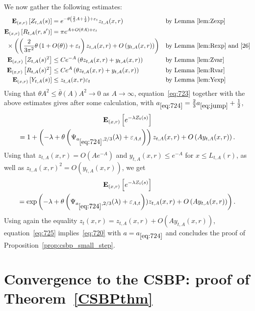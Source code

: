 \documentclass[10pt]{amsart}
\theoremstyle{definition}\newtheorem{defi}[theo]{Definition}\newtheorem{rema}[theo]{Remark}\newtheorem{exam}[theo]{Example}\newtheorem{exem}[theo]{Example}\newtheorem{nota}[theo]{Notation}
\newcommand*\eps{\varepsilon}
\newcommand*\E{\mathbf{E}}
\newcommand{\1} {\mathds{1}}
\renewcommand*\to{\rightarrow}
\begin{document}
We now gather the following estimates:
\begin{align*}
\E_{(x,r)}\left[Z_{t,A}(s)\right] &= e^{-\theta\left(\frac{2}{3}A+\frac{1}{2}\right)+\eps_t} z_{t,A}(x,r) && \text{by Lemma~\ref{lem:Zexp}}\\
\E_{(x,r)}\left[R_{t,A}(r,s')\right] &= \pi e^{A+O(\theta A)+\eps_t}\\
&\hspace{-1in}\times \left(\left(\frac{2}{3\pi^2}\theta\left(1+ O(\theta)\right) + \eps_t \right) z_{t,A}(x,r) + O\left(y_{t,A}(x,r)\right)\right) && \text{by Lemma~\ref{lem:Rexp} and~\eqref{26}}\\
\E_{(x,r)}\left[Z_{t,A}(s)^2\right] &\le Ce^{-A}\left(\theta z_{t,A}(x,r)+y_{t,A}(x,r)\right) && \text{by Lemma~\ref{lem:Zvar}}\\
\E_{(x,r)}\left[R_{t,A}(s)^2\right] &\le Ce^A\left(\theta z_{t,A}(x,r)+y_{t,A}(x,r)\right) && \text{by Lemma~\ref{lem:Rvar}}\\
\E_{(x,r)}\left[Y_{t,A}(s)\right] &\le z_{t,A}(x,r)\eps_t && \text{by Lemma~\ref{lem:Yexp}}
\end{align*}
Using that $\theta A^2 \le \bar\theta(A)A^2 \to 0$ as $A\to\infty$, equation~\eqref{eq:723} together with the above estimates gives after some calculation, with $a_{\eqref{eq:724}} = \frac{2}{3}a_{\eqref{eq:jump}}+\frac{1}{2}$,
\begin{multline}\label{eq:724}
\E_{(x,r)}\left[e^{-\lambda Z_t(s)}\right] \\
= 1 + \left(-\lambda + \theta\left(\Psi_{a_{\eqref{eq:724}},2/3}(\lambda)+\eps_{A,t}\right)\right)z_{t,A}(x,r) + O\left(Ay_{t,A}(x,r)\right).
\end{multline}
Using that $z_{t,A}(x,r) =O(A e^{-A})$ and $y_{t,A}(x,r) \le e^{-A}$ for $x\le L_{t,A}(r)$, as well as $z_{t,A}(x,r)^2 = O(y_{t,A}(x,r))$, we get
\begin{multline}\label{eq:725}
\E_{(x,r)}\left[e^{-\lambda Z_t(s)}\right] \\
= \exp\left(-\lambda + \theta\left(\Psi_{a_{\eqref{eq:724}},2/3}(\lambda)+\eps_{A,t}\right))z_{t,A}(x,r) + O\left(Ay_{t,A}(x,r)\right)\right).
\end{multline}
Using again the equality $z_t(x,r) = z_{t,A}(x,r) + O(Ay_{t,A}(x,r))$, equation~\eqref{eq:725} implies~\eqref{eq:720} with $a = a_{\eqref{eq:724}}$ and concludes the proof of Proposition~\ref{prop:csbp_small_step}.

\section{Convergence to the CSBP: proof of Theorem~\ref{CSBPthm}}\label{sec:csbp_proof}
\end{document}
